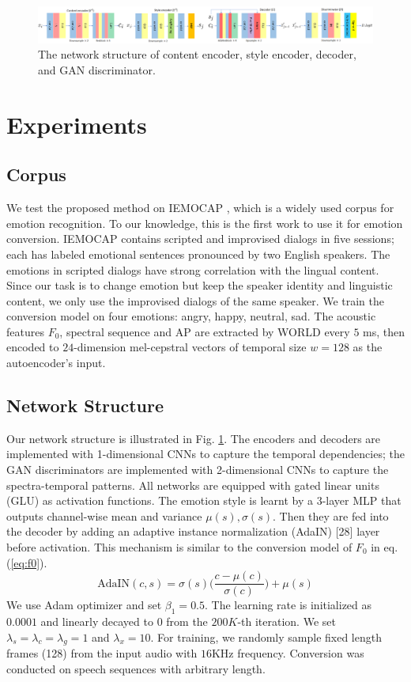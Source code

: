 \documentclass{article}
\begin{document}
\begin{figure}[t!]
\includegraphics[width=1.0\textwidth]{FIG/NN}
\caption{The network structure of content encoder, style encoder, decoder, and GAN discriminator.}
\label{fig:NN}
\end{figure}



\section{Experiments}
\label{sec:exp}

\subsection{Corpus}
We test the proposed method on IEMOCAP \cite{busso2008iemocap}, which is a widely used corpus for emotion recognition. To our knowledge, this is the first work to use it for emotion conversion. IEMOCAP contains scripted and improvised dialogs in five sessions; each has labeled emotional sentences pronounced by two English speakers. The emotions in scripted dialogs have strong correlation with the lingual content. Since our task is to change emotion but keep the speaker identity and linguistic content, we only use the improvised dialogs of the same speaker. We train the conversion model on four emotions: angry, happy, neutral, sad. The acoustic features $F_0$, spectral sequence and AP are extracted by WORLD \cite{morise2016world} every $5$ ms, then encoded to $24$-dimension mel-cepstral vectors of temporal size $w=128$ as the autoencoder's input.


\subsection{Network Structure}
Our network structure is illustrated in Fig. \ref{fig:NN}. The encoders and decoders are implemented with 1-dimensional CNNs to capture the temporal dependencies; the GAN discriminators are implemented with 2-dimensional CNNs to capture the spectra-temporal patterns. All networks are equipped with gated linear units (GLU) \cite{dauphin2017language} as activation functions. The emotion style is learnt by a $3$-layer MLP that outputs channel-wise mean and variance $\mu(s), \sigma(s)$. Then they are fed into the decoder by adding an adaptive instance normalization (AdaIN) [28] layer before activation. This mechanism is similar to the conversion model of $F_0$ in eq. (\ref{eq:f0}).
\begin{equation}
\text{AdaIN}(c,s) = \sigma(s)\Big(\frac{c-\mu(c)}{\sigma(c)}\Big) + \mu(s)
\end{equation}
We use Adam optimizer and set $\beta_1=0.5$. The learning rate is initialized as $0.0001$ and linearly decayed to $0$ from the $200K$-th iteration. We set $\lambda_s = \lambda_c = \lambda_g = 1$ and $\lambda_x=10$. For training, we randomly sample fixed length frames (128) from the input audio with $16$KHz frequency. Conversion was conducted on speech sequences with arbitrary length.
\end{document}
